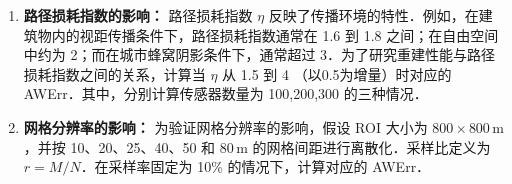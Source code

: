 \documentclass[a4paper,zihao=-4]{ctexart}
\begin{document}
\begin{enumerate}
    \item \textbf{路径损耗指数的影响：}
    路径损耗指数 $\eta$ 反映了传播环境的特性．例如，在建筑物内的视距传播条件下，路径损耗指数通常在 1.6 到 1.8 之间；在自由空间中约为 2；而在城市蜂窝阴影条件下，通常超过 3．为了研究重建性能与路径损耗指数之间的关系，计算当 $\eta$ 从 1.5 到 4 （以0.5为增量）时对应的 AWErr．其中，分别计算传感器数量为 100,200,300 的三种情况．


    \item \textbf{网格分辨率的影响：}
    为验证网格分辨率的影响，假设 ROI 大小为 $800 \times 800\,\mathrm{m}$，并按 10、20、25、40、50 和 $80\,\mathrm{m}$ 的网格间距进行离散化．采样比定义为 $r = M / N$．在采样率固定为 10\% 的情况下，计算对应的 AWErr．

\end{enumerate}
\end{document}
